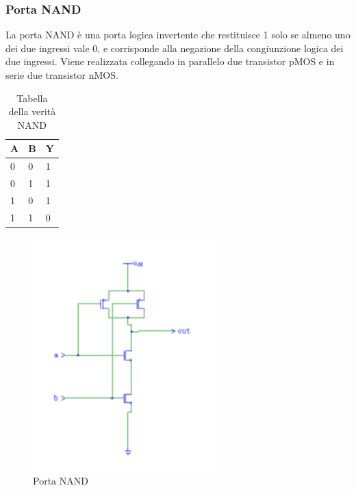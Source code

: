 \documentclass[10pt]{article}
\begin{document}
\begin{itemize}
\subsubsection{Porta NAND}
La porta NAND è una porta logica invertente che restituisce 1 solo se almeno uno dei due ingressi vale 0, e corrisponde alla negazione della congiunzione logica dei due ingressi. 
Viene realizzata collegando in parallelo due transistor pMOS e in serie due transistor nMOS.

\begin{table}[H]
    \begin{minipage}[b]{\textwidth}
    \centering
    \begin{tabular}{|ll|l|}
    \hline
    \textbf{A} & \textbf{B} & \textbf{Y} \\ \hline
    0          & 0          & 1          \\ 
    0          & 1          & 1          \\ 
    1          & 0          & 1          \\ 
    1          & 1          & 0          \\ \hline
    \end{tabular}
        \caption{Tabella della verità NAND}
        \label{table:student}
    \end{minipage}
    \end{table}
    
    \begin{figure}[H]
    \begin{minipage}[b]{\textwidth}
    
    \includegraphics[width=70mm]{nand}
    \caption{Porta NAND}
    \label{ }
    \end{minipage}
    \end{figure}


\end{itemize}
\end{document}
